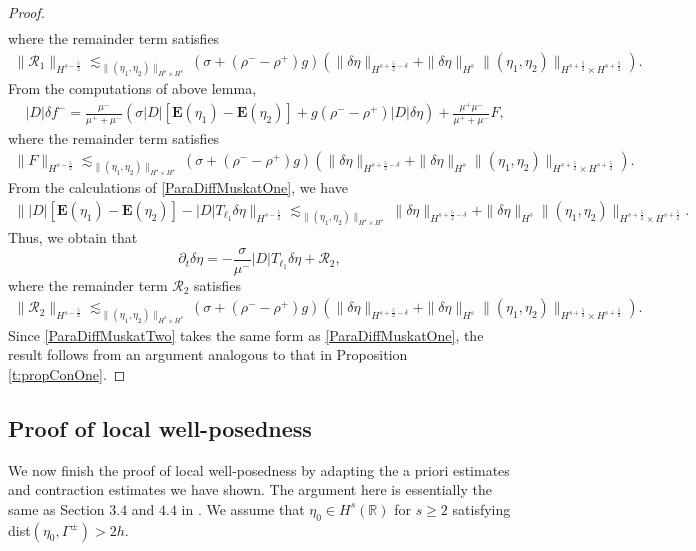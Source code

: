 \documentclass[12pt]{amsart}
\theoremstyle{definition}
\numberwithin{equation}{section}
\newcommand{\p}{\partial}
\newcommand{\R}{\mathbb{R}}
\newcommand{\f}{\frac}
\begin{document}
\begin{proof}
\begin{align*}
\end{align*}
where the remainder term satisfies
\begin{align*}
\|\mathcal{R}_1\|_{H^{s-\f52}}\lesssim_{\|(\eta_1, \eta_2)\|_{H^s\times H^s}}(\sigma+(\rho^--\rho^+)g) \left(\|\delta \eta \|_{H^{s+\f52-\delta}}
 + \| \delta \eta\|_{H^s}\|(\eta_1, \eta_2)\|_{H^{s+\f52}\times H^{s+\f52}}\right).
\end{align*}
From the computations of above lemma, 
\begin{align*}
&|D|\delta f^- = \f{\mu^-}{\mu^+ + \mu^-}(\sigma|D|[\mathbf{E}(\eta_1)-\mathbf{E}(\eta_2)] + g(\rho^- - \rho^+)|D|\delta \eta) + \f{\mu^+ \mu^-}{\mu^++\mu^-}F,
\end{align*}
where the remainder term satisfies
\begin{align*}
\|F\|_{H^{s-\f52}}\lesssim_{\|(\eta_1, \eta_2)\|_{H^s\times H^s}}(\sigma+(\rho^--\rho^+)g) \left(\|\delta \eta \|_{H^{s+\f52-\delta}}
 + \| \delta \eta\|_{H^s}\|(\eta_1, \eta_2)\|_{H^{s+\f52}\times H^{s+\f52}}\right).
\end{align*}
From the calculations of \eqref{ParaDiffMuskatOne}, we have
\begin{align*}
\||D|[\mathbf{E}(\eta_1)-\mathbf{E}(\eta_2)]-|D|T_{\ell_1}\delta\eta\|_{H^{s-\f52}}
\lesssim_{\|(\eta_1, \eta_2)\|_{H^s\times H^s}}\|\delta \eta \|_{H^{s+\f52-\delta}}
 + \| \delta \eta\|_{H^s}\|(\eta_1, \eta_2)\|_{H^{s+\f52}\times H^{s+\f52}}.
\end{align*}
Thus, we obtain that
\begin{equation} \label{ParaDiffMuskatTwo}
\p_t\delta \eta=-\f{\sigma}{\mu^-}|D|T_{\ell_1}\delta\eta+\mathcal{R}_2,
\end{equation}
where the remainder term $\mathcal{R}_2$ satisfies
\begin{align*}
\|\mathcal{R}_2\|_{H^{s-\f52}}\lesssim_{\|(\eta_1, \eta_2)\|_{H^s\times H^s}}(\sigma+(\rho^--\rho^+)g) \left(\|\delta \eta \|_{H^{s+\f52-\delta}}
 + \| \delta \eta\|_{H^s}\|(\eta_1, \eta_2)\|_{H^{s+\f52}\times H^{s+\f52}}\right).
\end{align*}
Since \eqref{ParaDiffMuskatTwo} takes the same form as \eqref{ParaDiffMuskatOne}, the result follows from an argument analogous to that in Proposition \ref{t:propConOne}.
\end{proof}

\subsection{Proof of local well-posedness}
We now finish the proof of local well-posedness by adapting the a priori estimates and contraction estimates we have shown.
The argument here is essentially the same as Section $3.4$ and $4.4$ in \cite{MR4131404}.
We assume that $\eta_0 \in H^s(\R)$ for $s\geq 2$ satisfying dist$(\eta_0, \Gamma^\pm)>2h$. 
\end{document}
